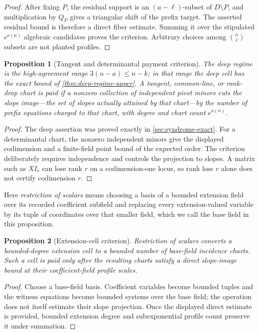 \documentclass[12pt,a4paper]{amsart}
\numberwithin{equation}{section}
\newtheorem{proposition}[proposition]{Proposition}
\theoremstyle{remark}
\begin{document}
\begin{proof}
After fixing \(P\), the residual support is an \((a-\ell)\)-subset of
\(D\setminus P\), and multiplication by \(Q_P\) gives a triangular shift
of the prefix target.  The asserted residual bound is therefore a direct
fiber estimate.  Summing it over the stipulated \(e^{o(n)}\) algebraic
candidates proves the criterion.  Arbitrary choices among
\(\binom n\ell\) subsets are not planted profiles.
\end{proof}

\begin{proposition}[Tangent and determinantal payment criterion]
\label{prop:tangent-payment}
The \emph{deep regime} is the high-agreement range
\(3(n-a)\le n-k\); in that range the deep cell has the exact bound of
\cref{thm:deep-regime-upper}.  A
tangent, common-line, or rank-drop chart is paid if a nonzero collection of
independent pivot minors cuts the \emph{slope image}---the set of slopes
actually attained by that chart---by the number of
prefix equations charged to that chart, with degree and chart count
\(e^{o(n)}\).
\end{proposition}

\begin{proof}
The deep assertion was proved exactly in \cref{sec:syndrome-exact}.  For a
determinantal chart, the nonzero independent minors give the displayed
codimension and a finite-field point bound of the expected order.  The
criterion deliberately requires independence and controls the projection
to slopes.  A matrix such as \(X I_r\) can lose rank \(r\) on a
codimension-one locus, so rank loss \(r\) alone does not certify codimension
\(r\).
\end{proof}

Here \emph{restriction of scalars} means choosing a basis of a bounded
extension field over its recorded coefficient subfield and replacing every
extension-valued variable by its tuple of coordinates over that smaller
field, which we call the base field in this proposition.

\begin{proposition}[Extension-cell criterion]\label{prop:extension-payment}
Restriction of scalars converts a bounded-degree extension cell to a
bounded number of base-field incidence charts.  Such a cell is paid only
after the resulting charts satisfy a direct slope-image bound at their
coefficient-field profile scales.
\end{proposition}

\begin{proof}
Choose a base-field basis.  Coefficient variables become bounded tuples and
the witness equations become bounded systems over the base field; the
operation does not itself estimate their slope projection.  Once the
displayed direct estimate is provided, bounded extension degree and
subexponential profile count preserve it under summation.
\end{proof}
\end{document}
